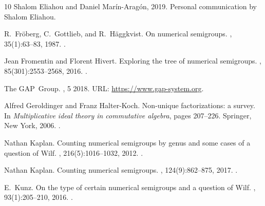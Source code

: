 \begin{thebibliography}{10}
Shalom Eliahou and Daniel Marín-Aragón, 2019.
\newblock Personal communication by Shalom Eliahou.

R.~Fr\"oberg, C.~Gottlieb, and R.~H\"aggkvist.
\newblock On numerical semigroups.
, 35(1):63--83, 1987.
\newblock \href {http://dx.doi.org/10.1007/BF02573091} {}.

Jean Fromentin and Florent Hivert.
\newblock Exploring the tree of numerical semigroups.
, 85(301):2553--2568, 2016.
\newblock \href {http://dx.doi.org/10.1090/mcom/3075} {}.

The GAP~Group.
, 5
  2018.
\newblock URL: \url{https://www.gap-system.org}.

Alfred Geroldinger and Franz Halter-Koch.
\newblock Non-unique factorizations: a survey.
\newblock In {\em Multiplicative ideal theory in commutative algebra}, pages
  207--226. Springer, New York, 2006.
\newblock \href {http://dx.doi.org/10.1007/978-0-387-36717-0_13}
  {}.

Nathan Kaplan.
\newblock Counting numerical semigroups by genus and some cases of a question
  of {W}ilf.
, 216(5):1016--1032, 2012.
\newblock \href {http://dx.doi.org/10.1016/j.jpaa.2011.10.038}
  {}.

Nathan Kaplan.
\newblock Counting numerical semigroups.
, 124(9):862--875, 2017.
\newblock \href {http://dx.doi.org/10.4169/amer.math.monthly.124.9.862}
  {}.

E.~Kunz.
\newblock On the type of certain numerical semigroups and a question of {W}ilf.
, 93(1):205--210, 2016.
\newblock \href {http://dx.doi.org/10.1007/s00233-015-9755-8}
  {}.


\end{thebibliography}
